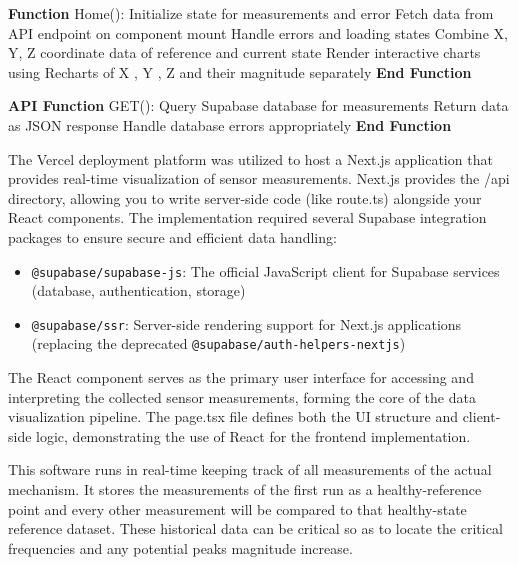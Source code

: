 {\begin{algorithm}[H]
\begin{algorithmic}[1]
			\STATE
			\STATE \textbf{Function} Home():
			\STATE \hspace{0.5cm} Initialize state for measurements and error
			\STATE \hspace{0.5cm} Fetch data from API endpoint on component mount
			\STATE \hspace{0.5cm} Handle errors and loading states
			\STATE \hspace{0.5cm} Combine X, Y, Z coordinate data of reference and current state
			\STATE \hspace{0.5cm} Render interactive charts using Recharts of X , Y , Z and their magnitude separately
			\STATE \textbf{End Function}
			
			\STATE
			\STATE \textbf{API Function} GET():
			\STATE \hspace{0.5cm} Query Supabase database for measurements
			\STATE \hspace{0.5cm} Return data as JSON response
			\STATE \hspace{0.5cm} Handle database errors appropriately
			\STATE \textbf{End Function}
		\end{algorithmic}
	\end{algorithm}
	
	The Vercel deployment platform was utilized to host a Next.js application that provides real-time visualization of sensor measurements. Next.js provides the /api directory, allowing you to write server-side code (like route.ts) alongside your React components. The implementation required several Supabase integration packages to ensure secure and efficient data handling:
	
	\begin{itemize}
		\item \texttt{@supabase/supabase-js}: The official JavaScript client for Supabase services (database, authentication, storage)
		\item \texttt{@supabase/ssr}: Server-side rendering support for Next.js applications (replacing the deprecated \texttt{@supabase/auth-helpers-nextjs})
	\end{itemize}
	
	The React component serves as the primary user interface for accessing and interpreting the collected sensor measurements, forming the core of the data visualization pipeline. The page.tsx file defines both the UI structure and client-side logic, demonstrating the use of React for the frontend implementation.
	
	This software runs in real-time keeping track of all measurements of the actual mechanism. It stores the measurements of the first run as a healthy-reference point and every other measurement will be compared to that healthy-state reference dataset. These historical data can be critical so as to locate the critical frequencies and any potential peaks magnitude increase.
	
}

